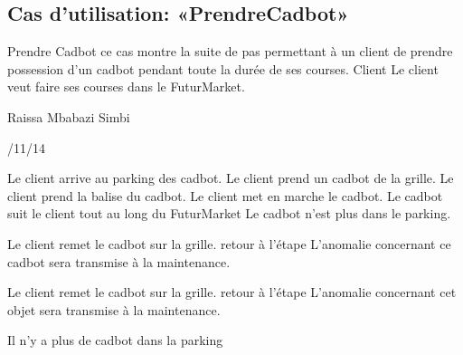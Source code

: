 \subsection{Cas d'utilisation: «PrendreCadbot» }

\startCU
\nom Prendre Cadbot
\but  ce cas montre la suite de pas permettant à un client de prendre possession d'un cadbot pendant toute la durée de ses courses.
\acteur Client
\precondition Le client veut faire ses courses dans le FuturMarket.

\auteur Raissa Mbabazi Simbi
\date 7/11/14

\nominal %
\startnominal
\etape[SA1] Le client arrive au parking des cadbot. 
\etape[RETOUR] 	Le client prend un cadbot de la grille.
\etape[SE1] Le client prend la balise du cadbot.
\etape Le client met en marche le cadbot.
\etape Le cadbot suit le client tout au long du FuturMarket
\stopnominal
\postcondition Le cadbot n'est plus dans le parking.

\alternatifs
\startalternatif[SA1] %
  \etape Le client remet le cadbot sur la grille.
  \etape retour à l'étape \in[RETOUR]
\stopcondition
\postcondition L'anomalie concernant ce cadbot sera transmise à la maintenance.
\stopalternatif

\startalternatif[SE1]
   \etape  Le client remet le cadbot sur la grille.
  \etape retour à l'étape \in[RETOUR]
\stopcondition
\postcondition L'anomalie concernant cet objet sera transmise à la maintenance.
\stopalternatif


\exception
Il n'y a plus de cadbot dans la parking
\stopCU
